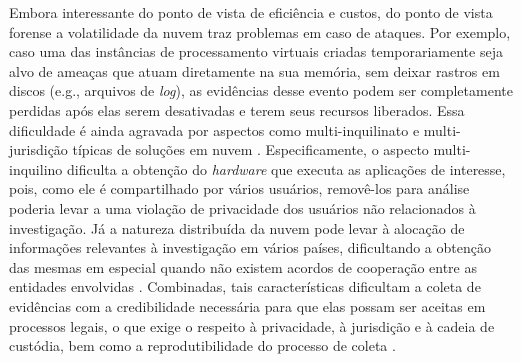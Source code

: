 \documentclass[conference]{IEEEtran}
\begin{document}
%
Embora interessante do ponto de vista de eficiência e custos, do ponto de vista forense a volatilidade da nuvem traz problemas em caso de ataques.
%
Por exemplo, caso uma das instâncias de processamento virtuais criadas temporariamente seja alvo de ameaças que atuam diretamente na sua memória, sem deixar rastros em discos (e.g., arquivos de \textit{log}), as evidências desse evento podem ser completamente perdidas após elas serem desativadas e terem seus recursos liberados.
%
Essa dificuldade é ainda agravada por aspectos como multi-inquilinato e multi-jurisdição típicas de soluções em nuvem \cite{Bash_Adv_in_Forensics:2015}.
%
Especificamente, o aspecto multi-inquilino dificulta a obtenção do \textit{hardware} que executa as aplicações de interesse, pois, como ele é compartilhado por vários usuários, removê-los para análise poderia levar a uma violação de privacidade dos usuários não relacionados à investigação. 
%
Já a natureza distribuída da nuvem pode levar à alocação de informações relevantes à investigação em vários países, dificultando a obtenção das mesmas em especial quando não existem acordos de cooperação entre as entidades envolvidas \cite{Dykstra_Acquiring_for_IAAS:2012}.
%
Combinadas, tais características dificultam a coleta de evidências com a credibilidade necessária para que elas possam ser aceitas em processos legais,  o que exige o respeito à privacidade, à jurisdição e à cadeia de custódia, bem como a reprodutibilidade do processo de coleta \cite{Rahman_Live_Forensics_Techniques:2015}.
\end{document}

